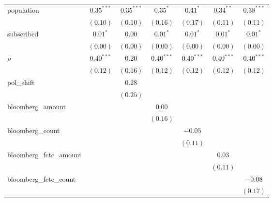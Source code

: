 \begin{table}[!h]
\begin{center}
\begin{tabular}{l c c c c c c }
population              & $0.35^{***}$  & $0.35^{***}$  & $0.35^{*}$    & $0.41^{*}$    & $0.34^{**}$  & $0.38^{***}$  \\
                        & $(0.10)$      & $(0.10)$      & $(0.16)$      & $(0.17)$      & $(0.11)$     & $(0.11)$      \\
subscribed              & $0.01^{*}$    & $0.00$        & $0.01^{*}$    & $0.01^{*}$    & $0.01^{*}$   & $0.01^{*}$    \\
                        & $(0.00)$      & $(0.00)$      & $(0.00)$      & $(0.00)$      & $(0.00)$     & $(0.00)$      \\
$\rho$                  & $0.40^{***}$  & $0.20$        & $0.40^{***}$  & $0.40^{***}$  & $0.40^{***}$ & $0.40^{***}$  \\
                        & $(0.12)$      & $(0.16)$      & $(0.12)$      & $(0.12)$      & $(0.12)$     & $(0.12)$      \\
pol\_shift              &               & $0.28$        &               &               &              &               \\
                        &               & $(0.25)$      &               &               &              &               \\
bloomberg\_amount       &               &               & $0.00$        &               &              &               \\
                        &               &               & $(0.16)$      &               &              &               \\
bloomberg\_count        &               &               &               & $-0.05$       &              &               \\
                        &               &               &               & $(0.11)$      &              &               \\
bloomberg\_fctc\_amount &               &               &               &               & $0.03$       &               \\
                        &               &               &               &               & $(0.11)$     &               \\
bloomberg\_fctc\_count  &               &               &               &               &              & $-0.08$       \\
                        &               &               &               &               &              & $(0.17)$      \\
\midrule

\end{tabular}
\end{center}
\end{table}
